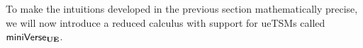 

To make the intuitions developed in the previous section mathematically precise, we will now introduce a reduced calculus with support for ueTSMs called $\mathsf{miniVerse}_\textbf{UE}$. 



